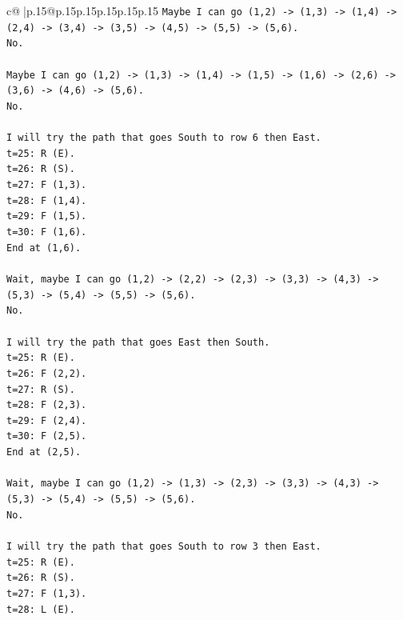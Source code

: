 \documentclass{article}
\begin{document}
{\begin{supertabular}{c@{$\;$}|p{.15\linewidth}@{}p{.15\linewidth}p{.15\linewidth}p{.15\linewidth}p{.15\linewidth}p{.15\linewidth}}
{{{\texttt{Maybe I can go (1,2) {-}> (1,3) {-}> (1,4) {-}> (2,4) {-}> (3,4) {-}> (3,5) {-}> (4,5) {-}> (5,5) {-}> (5,6).} \\
\texttt{No.} \\
\\ 
\texttt{Maybe I can go (1,2) {-}> (1,3) {-}> (1,4) {-}> (1,5) {-}> (1,6) {-}> (2,6) {-}> (3,6) {-}> (4,6) {-}> (5,6).} \\
\texttt{No.} \\
\\ 
\texttt{I will try the path that goes South to row 6 then East.} \\
\texttt{t=25: R (E).} \\
\texttt{t=26: R (S).} \\
\texttt{t=27: F (1,3).} \\
\texttt{t=28: F (1,4).} \\
\texttt{t=29: F (1,5).} \\
\texttt{t=30: F (1,6).} \\
\texttt{End at (1,6).} \\
\\ 
\texttt{Wait, maybe I can go (1,2) {-}> (2,2) {-}> (2,3) {-}> (3,3) {-}> (4,3) {-}> (5,3) {-}> (5,4) {-}> (5,5) {-}> (5,6).} \\
\texttt{No.} \\
\\ 
\texttt{I will try the path that goes East then South.} \\
\texttt{t=25: R (E).} \\
\texttt{t=26: F (2,2).} \\
\texttt{t=27: R (S).} \\
\texttt{t=28: F (2,3).} \\
\texttt{t=29: F (2,4).} \\
\texttt{t=30: F (2,5).} \\
\texttt{End at (2,5).} \\
\\ 
\texttt{Wait, maybe I can go (1,2) {-}> (1,3) {-}> (2,3) {-}> (3,3) {-}> (4,3) {-}> (5,3) {-}> (5,4) {-}> (5,5) {-}> (5,6).} \\
\texttt{No.} \\
\\ 
\texttt{I will try the path that goes South to row 3 then East.} \\
\texttt{t=25: R (E).} \\
\texttt{t=26: R (S).} \\
\texttt{t=27: F (1,3).} \\
\texttt{t=28: L (E).} \\
}}}
\end{supertabular}}
\end{document}

